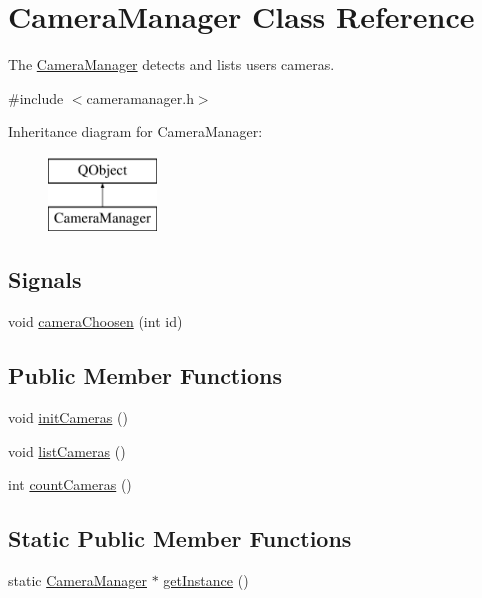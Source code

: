 \hypertarget{classCameraManager}{}\section{Camera\+Manager Class Reference}
\label{classCameraManager}


The \hyperlink{classCameraManager}{Camera\+Manager} detects and lists user\textquotesingle{}s cameras.  




{\ttfamily \#include $<$cameramanager.\+h$>$}

Inheritance diagram for Camera\+Manager\+:\begin{figure}[H]
\begin{center}
\leavevmode
\includegraphics[height=2.000000cm]{classCameraManager}
\end{center}
\end{figure}
\subsection*{Signals}
\begin{DoxyCompactItemize}
\item 
void \hyperlink{classCameraManager_ab081e5040bc902c4574626a75ed61595}{camera\+Choosen} (int id)
\end{DoxyCompactItemize}
\subsection*{Public Member Functions}
\begin{DoxyCompactItemize}
\item 
void \hyperlink{classCameraManager_abd6b233d62d1c698603aa1cdf6392a9a}{init\+Cameras} ()
\item 
void \hyperlink{classCameraManager_a202740c86ac639d2447031363a17282c}{list\+Cameras} ()
\item 
int \hyperlink{classCameraManager_a877ebf0c5c77e848b27e889470ed2de7}{count\+Cameras} ()
\end{DoxyCompactItemize}
\subsection*{Static Public Member Functions}
\begin{DoxyCompactItemize}
\item 
static \hyperlink{classCameraManager}{Camera\+Manager} $\ast$ \hyperlink{classCameraManager_abaf12aeae3470e2824736e70d66add15}{get\+Instance} ()
\end{DoxyCompactItemize}

